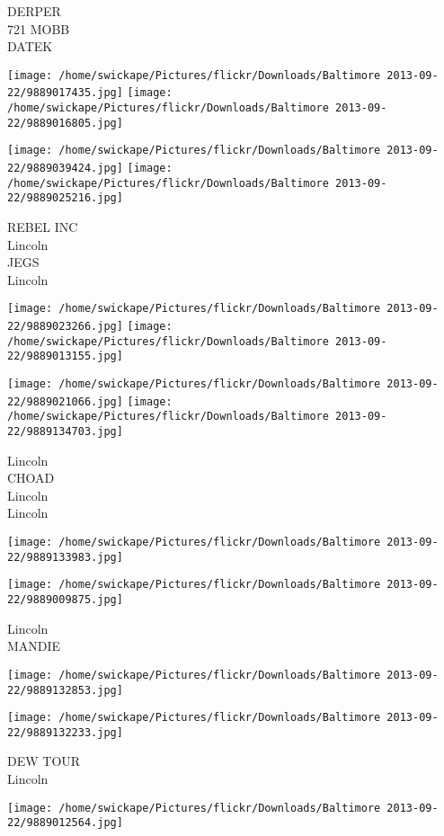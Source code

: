\documentclass[10pt,letterpaper]{article}
\begin{document}
DERPER\\
721 MOBB\\
DATEK
\pagebreak

\texttt{[image: /home/swickape/Pictures/flickr/Downloads/Baltimore 2013-09-22/9889017435.jpg]}
\texttt{[image: /home/swickape/Pictures/flickr/Downloads/Baltimore 2013-09-22/9889016805.jpg]}

\texttt{[image: /home/swickape/Pictures/flickr/Downloads/Baltimore 2013-09-22/9889039424.jpg]}
\texttt{[image: /home/swickape/Pictures/flickr/Downloads/Baltimore 2013-09-22/9889025216.jpg]}

REBEL INC\\
Lincoln\\
JEGS\\
Lincoln
\pagebreak

\texttt{[image: /home/swickape/Pictures/flickr/Downloads/Baltimore 2013-09-22/9889023266.jpg]}
\texttt{[image: /home/swickape/Pictures/flickr/Downloads/Baltimore 2013-09-22/9889013155.jpg]}

\texttt{[image: /home/swickape/Pictures/flickr/Downloads/Baltimore 2013-09-22/9889021066.jpg]}
\texttt{[image: /home/swickape/Pictures/flickr/Downloads/Baltimore 2013-09-22/9889134703.jpg]}

Lincoln\\
CHOAD\\
Lincoln\\
Lincoln
\pagebreak

\texttt{[image: /home/swickape/Pictures/flickr/Downloads/Baltimore 2013-09-22/9889133983.jpg]}

\vspace{0.25in}
\texttt{[image: /home/swickape/Pictures/flickr/Downloads/Baltimore 2013-09-22/9889009875.jpg]}

Lincoln\\
MANDIE
\pagebreak

\texttt{[image: /home/swickape/Pictures/flickr/Downloads/Baltimore 2013-09-22/9889132853.jpg]}

\vspace{0.25in}
\texttt{[image: /home/swickape/Pictures/flickr/Downloads/Baltimore 2013-09-22/9889132233.jpg]}

DEW TOUR\\
Lincoln
\pagebreak

\texttt{[image: /home/swickape/Pictures/flickr/Downloads/Baltimore 2013-09-22/9889012564.jpg]}
\end{document}
